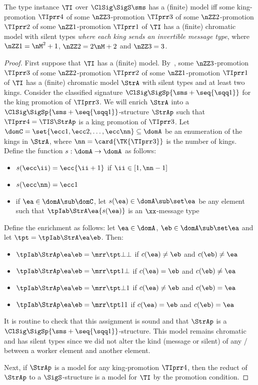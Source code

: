 \begin{remark}\label{rem:prop-kingsinv}
The type instance $\TI$ over $\ClSig\SigS\sms$ has a (finite) model
iff some king-promotion $\TIprr4$
of some $\nZZ3$-promotion $\TIprr3$
of some $\nZZ2$-promotion $\TIprr2$
of some $\nZZ1$-promotion $\TIprr1$ 
of $\TI$ has a (finite) chromatic model with silent types
\emph{where each king sends an invertible message type},
where $\nZZ1 = \nM^2+1$, $\nZZ2 = 2\nM+2$ and $\nZZ3 = 3$.
\end{remark}
\begin{proof}
First suppose that $\TI$ has a (finite) model.
By~,
some $\nZZ3$-promotion $\TIprr3$
of some $\nZZ2$-promotion $\TIprr2$
of some $\nZZ1$-promotion $\TIprr1$
of $\TI$ has a (finite) chromatic model $\StrA$ with silent types and at least
two kings.
Consider the classified signature $\ClSig\SigSp{\sms+\seq{\sqq1}}$ for the king
promotion of $\TIprr3$.
We will enrich $\StrA$ into a $\ClSig\SigSp{\sms+\seq{\sqq1}}$-structure
$\StrAp$ such that $\TIprr4 = \TIS\StrAp$ is a king promotion of $\TIprr3$.
Let $\domC = \set{\ecc1,\ecc2,\dots,\ecc\nn}\subseteq\domA$ be an enumeration
of the kings in $\StrA$, where $\nn=\card{\TK{\TIprr3}}$ is the number of kings.
Define the function $s : \domA\to\domA$ as follows:
\begin{itemize}
  \item $s(\ecc\ii) = \ecc{\ii+1}$ if $\ii\in[1,\nn-1]$
  \item $s(\ecc\nn) = \ecc1$
  \item if $\ea\in\domA\sub\domC$, let $s(\ea)\in\domA\sub\set\ea$
  be any element such that $\tpIab\StrA\ea{s(\ea)}$ is an $\xx$-message type
\end{itemize}
Define the enrichment as follows:
let $\ea\in\domA$, $\eb\in\domA\sub\set\ea$ and let $\tpt=\tpIab\StrA\ea\eb$.
Then:
\begin{itemize}
  \item $\tpIab\StrAp\ea\eb = \mrr\tpt\bot\bot$
  if $c(\ea)\neq\eb$ and $c(\eb)\neq\ea$
  \item $\tpIab\StrAp\ea\eb = \mrr\tpt1\bot$
  if $c(\ea)=\eb$ and $c(\eb)\neq\ea$
  \item $\tpIab\StrAp\ea\eb = \mrr\tpt\bot1$
  if $c(\ea)\neq\eb$ and $c(\eb)=\ea$
  \item $\tpIab\StrAp\ea\eb = \mrr\tpt11$
  if $c(\ea)=\eb$ and $c(\eb)=\ea$
\end{itemize}
It is routine to check that this assignment is sound and that $\StrAp$ is a
$\ClSig\SigSp{\sms+\seq{\sqq1}}$-structure.
This model remains chromatic and has silent types since we did not alter the
kind (message or silent) of any \twotype/ between a worker element and another
element.

Next, if $\StrAp$ is a model for any king-promotion $\TIprr4$, then the reduct
of $\StrAp$ to a $\SigS$-structure is a model for $\TI$ by the promotion
condition.
\end{proof}

